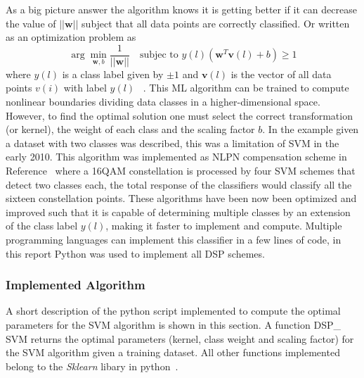As a big picture answer the algorithm knows it is getting better if it can decrease the value of $||\textbf{w}||$ subject that all data points are correctly classified. Or written as an optimization problem as
\begin{equation}
\arg\min_{\textbf{w},b}\frac{1}{||\textbf{w}||} \ \ \  \text{   subjec to } y(l)(\textbf{w}^{T}\textbf{v}(l)+b)\geq1 
\end{equation}
where $y(l)$ is a class label given by $\pm 1$ and $\textbf{v}(l)$ is the vector of all data points $v(i)$ with label $y(l)$  ~\cite{boser1992training}. This ML algorithm can be trained to compute nonlinear boundaries dividing data classes in a higher-dimensional space. However, to find the optimal solution one must select the correct transformation (or kernel), the weight of each class and the scaling factor $b$. In the example given a dataset with two classes was described, this was a limitation of SVM in the early 2010. This algorithm  was implemented as NLPN compensation scheme in Reference~\cite{Nonparameter} where a 16QAM constellation is processed by four SVM schemes that detect two classes each, the total response of the classifiers would classify all the sixteen constellation points. These algorithms have been now been optimized and improved such that it is capable of determining multiple classes by an extension of the class label $y(l)$, making it faster to implement and compute. Multiple programming languages can implement this classifier in a few lines of code, in this report Python was used to implement all DSP schemes.
\subsubsection{Implemented Algorithm}

A short description of the python script implemented to compute the optimal parameters for the SVM algorithm is shown in this section. A function DSP\_ SVM returns the optimal parameters (kernel, class weight and scaling factor) for the SVM algorithm given a training dataset. All other functions implemented belong to the \textit{Sklearn} libary in python~\cite{scikit-learn}.

